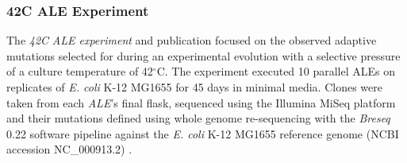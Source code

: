 \documentclass[12pt,final,masters,chapterheads]{ucsd}  %
\begin{document}
\subsubsection{42C ALE Experiment}
The \textit{42C} \textit{ALE experiment} and publication focused on the observed adaptive mutations selected for during an experimental evolution with a selective pressure of a culture temperature of 42$^{\circ}$C. The experiment executed 10 parallel ALEs on replicates of \textit{E. coli} K-12 MG1655 for 45 days in minimal media. Clones were taken from each \textit{ALE}'s final flask, sequenced using the Illumina MiSeq platform and their mutations defined using whole genome re-sequencing with the \textit{Breseq} 0.22 software pipeline against the \textit{E. coli} K-12 MG1655 reference genome (NCBI accession NC\_000913.2) \cite{pmid25015645}.
\end{document}
